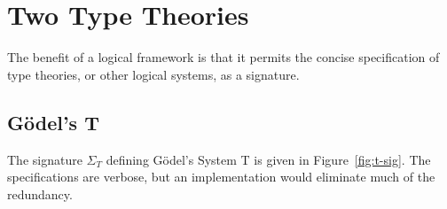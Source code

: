 \documentclass[11pt,twoside]{article}
\newcommand{\parens}[1]{(#1)}
\newcommand{\const}[1]{\textbf{#1}}
\newcommand{\arrclass}[2]{{#1}\to{#2}}
\newcommand{\appobj}[2]{{#1}\,{#2}}
\begin{document}
\section{Two Type Theories}

The benefit of a logical framework is that it permits the concise specification of type
theories, or other logical systems, as a signature.

\subsection{G\"odel's T}

\newcommand{\tpsort}{\const{tp}}
\newcommand{\nattp}{\const{nat}}
\newcommand{\arrtp}{\const{arr}}
\newcommand{\arrof}[2]{\appobj{\appobj{\arrtp}{#1}}{#2}}

\newcommand{\elfam}{\const{el}}
\newcommand{\elof}[1]{\appobj{\elfam}{#1}}
\newcommand{\elofp}[1]{\appobj{\elfam}{\parens{#1}}}

\newcommand{\zerocon}{\const{zero}}
\newcommand{\succcon}{\const{succ}}
\newcommand{\succof}[1]{\appobj{\succcon}{#1}}
\newcommand{\reccon}{\const{rec}}
\newcommand{\recof}[4]{\appobj{\appobj{\appobj{\appobj{\reccon}{#1}}{#2}}{#3}}{#4}}

\newcommand{\lamcon}{\const{lam}}
\newcommand{\lamof}[3]{\appobj{\appobj{\appobj{\lamcon}{#1}}{#2}}{#3}}
\newcommand{\appcon}{\const{app}}
\newcommand{\appof}[4]{\appobj{\appobj{\appobj{\appobj{\appcon}{#1}}{#2}}{#3}}{#4}}

\newcommand{\natbetaz}{\const{nat-$\beta$-z}}
\newcommand{\natbetas}{\const{nat-$\beta$-s}}
\newcommand{\arrbeta}{\const{arr-$\beta$}}
\newcommand{\arreta}{\const{arr-$\eta$}}
\newcommand{\pibeta}{\const{pi-$\beta$}}
\newcommand{\pieta}{\const{pi-$\eta$}}

The signature $\Sigma_{T}$ defining G\"{o}del's System T is given in Figure~\ref{fig:t-sig}.
The specifications are verbose, but an implementation would eliminate much of the
redundancy.

\begin{comment}
In particular the outermost quantifiers on the classes of constants can be
safely omitted when their class is evident.  For example, it would be sensible to drop the
quantification over objects of sort $\tpsort$ in Figure~\ref{fig:t-sig}.  For example, the
declaration of $\lamcon$ could be abbreviated to
\begin{align*}
  \lamcon & : \arrclass{\parens{\arrclass{\elof{A_{1}}}{\elof{A_{2}}}}}{\elofp{\arrof{A_{1}}{A_{2}}}},
\end{align*}
with the outermost quantification over $A_{1}$ and $A_{2}$ of sort $\tpsort$ being
understood.  Correspondinly, it would be sensible to write $\lamof{\_{}}{\_{}}{F}$ when
the class of $F$ is given as $\arrclass{\elof{A_{1}}}{\elof{A_{2}}}$, the omitted
arguments being inferrable from context.  An abbreviated form of $\Sigma_{T}$ is given in
Figure~\ref{fig:t-sig-abbr} for comparison.
\end{comment}
\end{document}
